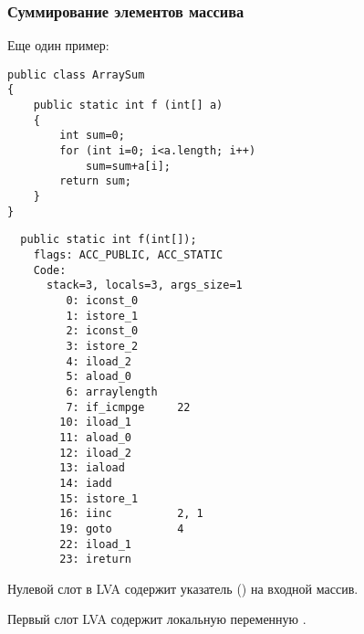\subsubsection{Суммирование элементов массива}

Еще один пример:

\begin{lstlisting}[style=customjava]
public class ArraySum
{
	public static int f (int[] a)
	{
		int sum=0;
		for (int i=0; i<a.length; i++)
			sum=sum+a[i];
		return sum;
	}
}
\end{lstlisting}

\begin{lstlisting}
  public static int f(int[]);
    flags: ACC_PUBLIC, ACC_STATIC
    Code:
      stack=3, locals=3, args_size=1
         0: iconst_0      
         1: istore_1      
         2: iconst_0      
         3: istore_2      
         4: iload_2       
         5: aload_0       
         6: arraylength   
         7: if_icmpge     22
        10: iload_1       
        11: aload_0       
        12: iload_2       
        13: iaload        
        14: iadd          
        15: istore_1      
        16: iinc          2, 1
        19: goto          4
        22: iload_1       
        23: ireturn       
\end{lstlisting}

Нулевой слот в \ac{LVA} содержит указатель () на входной массив.

Первый слот \ac{LVA} содержит локальную переменную .
